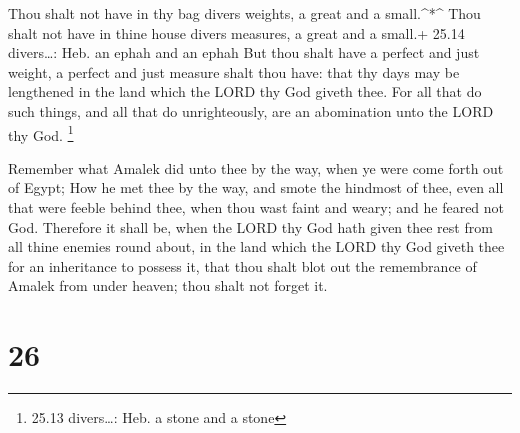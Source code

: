  Thou shalt not have in thy bag divers weights, a great and
a small.\^{}*\^{}  Thou shalt not have in thine house
divers measures, a great and a small.+ 25.14 divers\ldots: Heb. an ephah
and an ephah  But thou shalt have a perfect and just
weight, a perfect and just measure shalt thou have: that thy days may be
lengthened in the land which the LORD thy God giveth thee. 
For all that do such things, and all that do unrighteously, are an
abomination unto the LORD thy God. \footnote{25.13 divers\ldots: Heb. a
  stone and a stone}

 Remember what Amalek did unto thee by the way, when ye
were come forth out of Egypt;  How he met thee by the way,
and smote the hindmost of thee, even all that were feeble behind thee,
when thou wast faint and weary; and he feared not God. 
Therefore it shall be, when the LORD thy God hath given thee rest from
all thine enemies round about, in the land which the LORD thy God giveth
thee for an inheritance to possess it, that thou shalt blot out the
remembrance of Amalek from under heaven; thou shalt not forget it.

\hypertarget{section-25}{%
\section{26}\label{section-25}}

